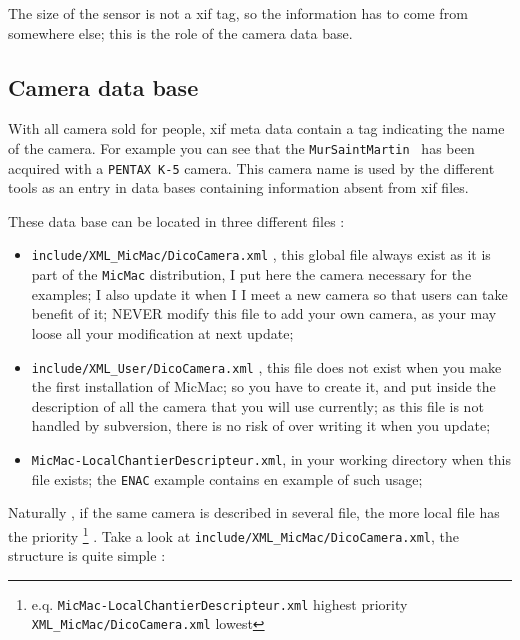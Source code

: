 The size of the sensor is not a xif tag, so the information has to come from
somewhere else; this is the role of the camera data base.


\subsection{Camera data base}
\label{CamDB}

With all camera sold for people, xif meta data contain a tag indicating the 
name of the camera.  For example you can see that the {\tt MurSaintMartin }
has been acquired with a {\tt PENTAX K-5} camera. This camera name is
used by the different tools as an entry in data bases containing  information
absent from xif files.

These data base can be located in three different files :

\begin{itemize}
   \item  {\tt  include/XML\_MicMac/DicoCamera.xml} , this global file always exist as
         it is part of the {\tt MicMac} distribution, I put here the camera necessary
         for the examples; I also update it when I  I meet a new camera 
         so that  users can take benefit of it;
         NEVER modify this file to add your own camera, as your may loose all your
         modification at next update; 
   
   \item  {\tt  include/XML\_User/DicoCamera.xml} , this file does not exist
         when you make the first installation of MicMac; so you have to create it,
         and put inside the description of all the camera that you will use
         currently; as this file is not handled by subversion, there is no risk
         of over writing it when you update;

   \item  {\tt  MicMac-LocalChantierDescripteur.xml},  in your working 
          directory when this file exists; the {\tt ENAC} example contains
          en example of such usage;
\end{itemize}

Naturally , if the same camera is described in several file, the more local file has the 
priority \footnote{e.q. {\tt MicMac-LocalChantierDescripteur.xml} highest priority
{\tt XML\_MicMac/DicoCamera.xml} lowest} .
Take a look at  {\tt  include/XML\_MicMac/DicoCamera.xml}, the structure is quite
simple :


